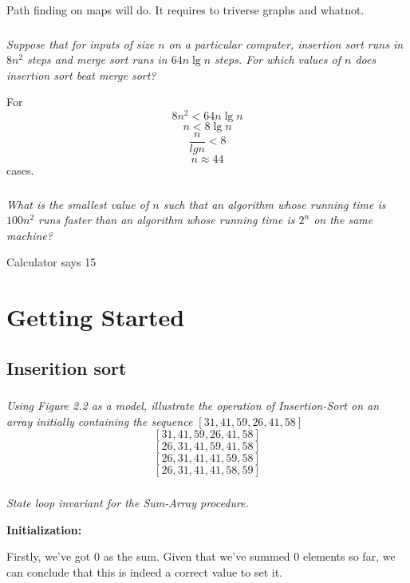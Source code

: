 \documentclass[11pt,oneside,titlepage]{book}
\begin{document}
Path finding on maps will do. It requires to triverse graphs and whatnot.

\subsection{}

\textit{Suppose that for inputs of size $n$ on a particular computer, insertion sort
  runs in $8n^2$ steps and merge sort runs in $64n \lg n$ steps. For which values of $n$
  does insertion sort beat merge sort?}

For
$$8 n^2 < 64 n \lg n$$
$$n <8 \lg n$$
$$\frac{n}{lg n} < 8$$
$$n \approx 44$$
cases.


\subsection{}

\textit{What is the smallest value of $n$ such that an algorithm whose running time is $100n^2$
  runs faster than an algorithm whose running time is $2^n$ on the same machine?}

Calculator says 15

\chapter{Getting Started}


\section{Inserition sort}

\subsection{}

\textit{Using Figure 2.2 as a model, illustrate the operation of Insertion-Sort on an
  array initially containing the sequence $[31, 41, 59, 26, 41, 58]$}
$$[31, 41, 59, 26, 41, 58]$$
$$[26, 31, 41, 59, 41, 58]$$
$$[26, 31, 41, 41, 59, 58]$$
$$[26, 31, 41, 41, 58, 59]$$

\subsection{}

\textit{State loop invariant for the Sum-Array procedure.}

\textbf{Initialization: }

Firstly, we've got 0 as the sum. Given that we've summed 0 elements so far, we can conclude
that this is indeed a correct value to set it.
\end{document}
